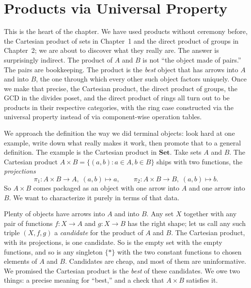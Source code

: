 \section{Products via Universal Property}\label{sec:products}

This is the heart of the chapter. We have used products without ceremony
before, the Cartesian product of sets in Chapter~1 and the direct product of
groups in Chapter~2; we are about to discover what they really are. The
answer is surprisingly indirect. The product of $A$ and $B$ is not ``the
object made of pairs.'' The pairs are bookkeeping. The product is the
\textit{best} object that has arrows into $A$ and into $B$, the one through
which every other such object factors uniquely. Once we make that precise,
the Cartesian product, the direct product of groups, the GCD in the divides
poset, and the direct product of rings all turn out to be products in their
respective categories, with the ring case constructed via the universal
property instead of via component-wise operation tables.

\noindent We approach the definition the way we did terminal objects: look
hard at one example, write down what really makes it work, then promote
that to a general definition. The example is the Cartesian product in
$\mathbf{Set}$. Take sets $A$ and $B$. The Cartesian product $A \times B =
\{(a, b) : a \in A, b \in B\}$ ships with two functions, the
\textit{projections}
\[ \pi_1 : A \times B \to A, \; (a, b) \mapsto a, \qquad \pi_2 : A \times B
\to B, \; (a, b) \mapsto b. \]
So $A \times B$ comes packaged as an object with one arrow into $A$ and one
arrow into $B$. We want to characterize it purely in terms of that data.

\noindent Plenty of objects have arrows into $A$ and into $B$. Any set $X$
together with any pair of functions $f : X \to A$ and $g : X \to B$ has the
right shape; let us call any such triple $(X, f, g)$ a
\textit{candidate} for the product of $A$
and $B$. The Cartesian product, with its projections, is one candidate. So
is the empty set with the empty functions, and so is any singleton $\{*\}$
with the two constant functions to chosen elements of $A$ and $B$.
Candidates are cheap, and most of them are uninformative. We promised the
Cartesian product is the \textit{best} of these candidates. We owe two
things: a precise meaning for ``best,'' and a check that $A \times B$
satisfies it.

